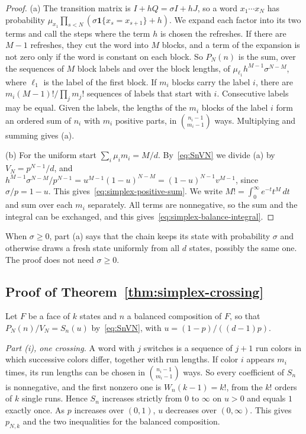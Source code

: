 \begin{proof}
(a) The transition matrix is $I+hQ=\sigma I+hJ$, so a word $x_1\cdots x_N$ has probability
$\mu_{x_1}\prod_{s<N}(\sigma\mathbf 1\{x_s=x_{s+1}\}+h)$. We expand each factor into its two
terms and call the steps where the term $h$ is chosen the refreshes. If there are $M-1$
refreshes, they cut the word into $M$ blocks, and a term of the expansion is not zero only if the
word is constant on each block. So $P_N(n)$ is the sum, over the sequences of $M$ block labels
and over the block lengths, of $\mu_{\ell_1}h^{M-1}\sigma^{N-M}$, where $\ell_1$ is the label of
the first block. If $m_i$ blocks carry the label $i$, there are $m_i(M-1)!/\prod_jm_j!$ sequences
of labels that start with $i$. Consecutive labels may be equal. Given the labels, the lengths of
the $m_i$ blocks of the label $i$ form an ordered sum of $n_i$ with $m_i$ positive parts, in
$\binom{n_i-1}{m_i-1}$ ways. Multiplying and summing gives (a).

(b) For the uniform start $\sum_i\mu_im_i=M/d$. By~\eqref{eq:SnVN} we divide (a) by
$V_N=p^{N-1}/d$, and $h^{M-1}\sigma^{N-M}/p^{N-1}=u^{M-1}(1-u)^{N-M}=(1-u)^{N-1}v^{M-1}$, since
$\sigma/p=1-u$. This gives~\eqref{eq:simplex-positive-sum}. We write
$M!=\int_0^\infty e^{-t}t^M\,dt$ and sum over each $m_i$ separately. All terms are nonnegative, so
the sum and the integral can be exchanged, and this gives~\eqref{eq:simplex-balance-integral}.
\end{proof}

When $\sigma\ge0$, part (a) says that the chain keeps its state with probability $\sigma$ and
otherwise draws a fresh state uniformly from all $d$ states, possibly the same one. The proof
does not need $\sigma\ge0$.

\subsection{Proof of Theorem~\ref{thm:simplex-crossing}}

Let $F$ be a face of $k$ states and $n$ a balanced composition of $F$, so that $P_N(n)/V_N=S_n(u)$
by~\eqref{eq:SnVN}, with $u=(1-p)/((d-1)p)$.

\emph{Part (i), one crossing.} A word with $j$ switches is a sequence of $j+1$ run colors in
which successive colors differ, together with run lengths. If color $i$ appears $m_i$ times,
its run lengths can be chosen in $\binom{n_i-1}{m_i-1}$ ways. So every coefficient of $S_n$ is
nonnegative, and the first nonzero one is $W_n(k-1)=k!$, from the $k!$ orders of $k$ single
runs. Hence $S_n$ increases strictly from $0$ to $\infty$ on $u>0$ and equals $1$ exactly once.
As $p$ increases over $(0,1)$, $u$ decreases over $(0,\infty)$. This gives $p_{N,k}$ and the
two inequalities for the balanced composition.

